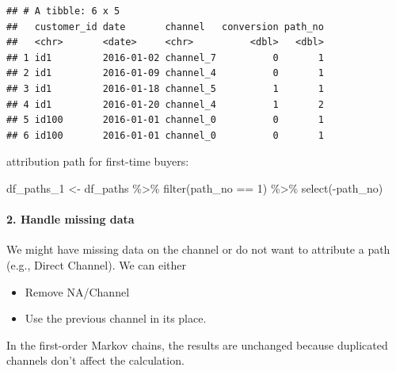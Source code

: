 \documentclass[
]{book}
\newenvironment{Shaded}{\begin{snugshade}}{\end{snugshade}}
\newcommand{\DecValTok}[1]{\textcolor[rgb]{0.00,0.00,0.81}{#1}}
\newcommand{\FunctionTok}[1]{\textcolor[rgb]{0.00,0.00,0.00}{#1}}
\newcommand{\NormalTok}[1]{#1}
\newcommand{\OtherTok}[1]{\textcolor[rgb]{0.56,0.35,0.01}{#1}}
\newcommand{\SpecialCharTok}[1]{\textcolor[rgb]{0.00,0.00,0.00}{#1}}
\providecommand{\tightlist}{%
  \setlength{\itemsep}{0pt}\setlength{\parskip}{0pt}}
\begin{document}
\begin{verbatim}
## # A tibble: 6 x 5
##   customer_id date       channel   conversion path_no
##   <chr>       <date>     <chr>          <dbl>   <dbl>
## 1 id1         2016-01-02 channel_7          0       1
## 2 id1         2016-01-09 channel_4          0       1
## 3 id1         2016-01-18 channel_5          1       1
## 4 id1         2016-01-20 channel_4          1       2
## 5 id100       2016-01-01 channel_0          0       1
## 6 id100       2016-01-01 channel_0          0       1
\end{verbatim}

attribution path for first-time buyers:

\begin{Shaded}
\begin{Highlighting}[]
\NormalTok{df\_paths\_1 }\OtherTok{\textless{}{-}}\NormalTok{ df\_paths }\SpecialCharTok{\%\textgreater{}\%}
        \FunctionTok{filter}\NormalTok{(path\_no }\SpecialCharTok{==} \DecValTok{1}\NormalTok{) }\SpecialCharTok{\%\textgreater{}\%}
        \FunctionTok{select}\NormalTok{(}\SpecialCharTok{{-}}\NormalTok{path\_no)}
\end{Highlighting}
\end{Shaded}

\hypertarget{handle-missing-data}{%
\paragraph{2. Handle missing data}\label{handle-missing-data}}

We might have missing data on the channel or do not want to attribute a path (e.g., Direct Channel). We can either

\begin{itemize}
\tightlist
\item
  Remove NA/Channel
\item
  Use the previous channel in its place.
\end{itemize}

In the first-order Markov chains, the results are unchanged because duplicated channels don't affect the calculation.
\end{document}
